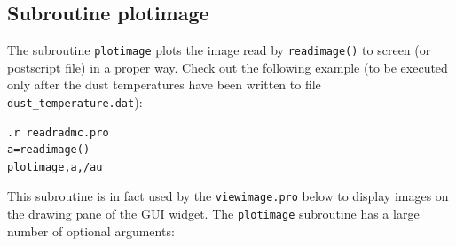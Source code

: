 \documentclass{report}
\newenvironment{asciibox}%
  {\begin{list}{}{%
    \setlength{\topsep}{0.5em}%
    \setlength{\parskip}{0em}%
    \setlength{\parsep}{0em}%
    \setlength{\itemsep}{0em}%
    \setlength{\rightmargin}{0em}%
    \setlength{\leftmargin}{3.0em}%
    \setlength{\labelsep}{1em}%
    \setlength{\labelwidth}{2em}%
  }\normalfont\footnotesize\item}
  {\end{list}}
\begin{document}
\subsection{Subroutine plotimage}
%
The subroutine {\small\tt plotimage} plots the image read by {\small\tt readimage()} to
screen (or postscript file) in a proper way. Check out the following 
example (to be executed only after the dust temperatures have been
written to file {\small\tt dust\_temperature.dat}):
\begin{asciibox}\begin{verbatim}
.r readradmc.pro
a=readimage()
plotimage,a,/au
\end{verbatim}\end{asciibox}
This subroutine is in fact used by the {\small\tt viewimage.pro} below to display
images on the drawing pane of the GUI widget. The {\small\tt plotimage} subroutine
has a large number of optional arguments:
\end{document}
